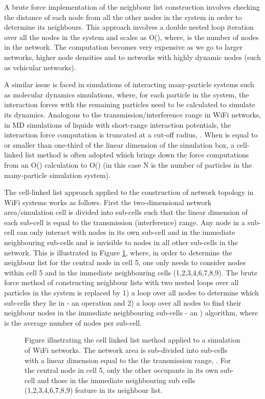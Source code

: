 \documentclass{elsart}
\begin{document}
A brute force implementation of the neighbour list construction involves 
checking the distance of each node from
all the other nodes in the system in order to determine its neighbours.
This approach involves a 
double nested loop iteration over all the nodes in the system and scales 
as O(), where,  is the number of nodes in the network. The 
computation becomes very expensive as we 
go to larger networks, higher node densities and to networks with 
highly dynamic nodes (such as vehicular networks).

A similar issue is faced in simulations of interacting many-particle 
systems such as molecular dynamics simulations, where, 
for each particle in the system, the interaction forces with the remaining 
particles need  to be calculated to simulate its dynamics. Analogous to 
the transmission/interference range in WiFi networks, in MD simulations
of liquids with short-range interaction potentials, the interaction
force computation is truncated at a cut-off radius, . When  is 
equal to or smaller than one-third of the linear dimension of the 
simulation box, a cell-linked list method is often adopted
which brings down the force computations from an O() calculation 
to O() (in this case N is the number of particles in the many-particle 
simulation system). 

The cell-linked list approach \cite{allenandtildesley} applied to the 
construction of  network topology in WiFi systems works as follows.
First the two-dimensional network area/simulation 
cell is divided into sub-cells such that the linear dimension of each 
sub-cell is equal to the transmission (interference) range. 
Any node in a sub-cell 
can only interact with nodes in its own sub-cell and in the 
immediate neighbouring sub-cells and is invisible to nodes in all other 
sub-cells in the network. This is illustrated in Figure \ref{f:sys}, 
where, in order to determine the neighbour list for the central node in 
cell 5, one only needs to consider nodes  within cell 5 and in the 
immediate neighbouring cells (1,2,3,4,6,7,8,9). The brute force method of 
constructing neighbour lists with two nested loops over all particles in 
the system is replaced by 1) a loop over all nodes to determine which 
sub-cells they lie in - an  operation and 2) a loop over all nodes to find their neighbour nodes in the immediate neighbouring sub-cells - 
an ) 
algorithm, where  is the average number of nodes per sub-cell. 

\begin{figure}
\centering
{}
\caption{Figure illustrating the cell linked list method 
\cite{allenandtildesley} 
applied to a simulation of WiFi networks. The network
area is sub-divided into sub-cells with a linear dimension equal to the the 
transmission range, . For the central node in cell 5, only the other 
occupants in its own sub-cell and those in the immediate neighbouring sub 
cells (1,2,3,4,6,7,8,9) feature in its neighbour list.}
\label{f:sys}
\end{figure}
\end{document}
